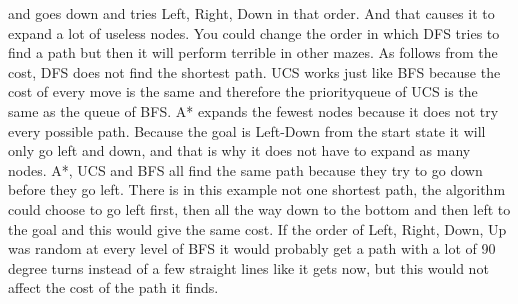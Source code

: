 and goes down and tries Left, Right, Down in that order. And that causes it to expand a lot of useless nodes. You could change the 
order in which DFS tries to find a path but then it will perform terrible in other mazes. As follows from the cost, DFS does not 
find the shortest path.
UCS works just like BFS because the cost of every move is the same and therefore the priorityqueue of UCS is the same as the queue of BFS.
A* expands the fewest nodes because it does not try every possible path. Because the goal is Left-Down from the start state
it will only go left and down, and that is why it does not have to expand as many nodes.
A*, UCS and BFS all find the same path because they try to go down before they go left. 
There is in this example not one shortest path, the algorithm could choose to go left first, then all the way down to the bottom
and then left to the goal and this would give the same cost. If the order of Left, Right, Down, Up was random at every level of BFS
it would probably get a path with a lot of 90 degree turns instead of a few straight lines like it gets now, 
but this would not affect the cost of the path it finds.
